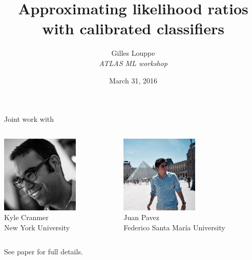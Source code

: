 \documentclass{beamer}
\title{{\bf Approximating likelihood ratios with calibrated classifiers}}
\author{
Gilles Louppe\\
{\it ATLAS ML workshop}
}
\date{March 31, 2016}
\let\oldcitep=\citep
\renewcommand\citep[1]{\hyperlink{#1}{\oldcitep{#1}}}
\begin{document}
\begin{frame}[plain]
\titlepage
\end{frame}

\begin{frame}
    \centering
    Joint work with
    \vspace{2em}

    \begin{columns}
      \begin{column}[t]{0.45\textwidth}
        \centering
        \includegraphics[height=10em]{figures/kyle.jpg}\\
        Kyle Cranmer\\
        {\scriptsize New York University}
      \end{column}
      \begin{column}[t]{0.45\textwidth}
          \centering
          \includegraphics[height=10em]{figures/juan.jpg}\\
          Juan Pavez\\
          {\scriptsize Federico Santa Mar\'ia University}
      \end{column}
    \end{columns}

    \vspace{2em}

    See paper \citep{cranmer2015approximating} for full details.
\end{frame}
\end{document}
